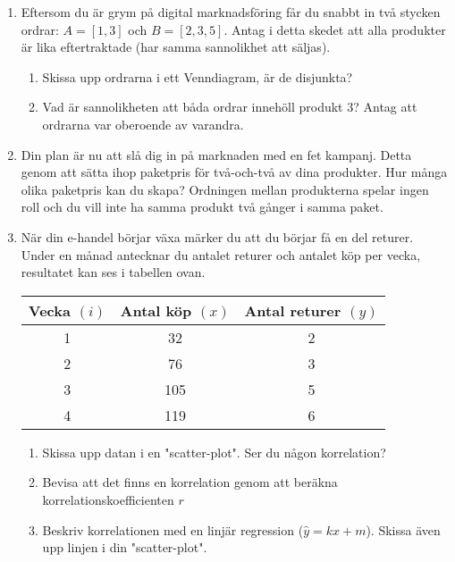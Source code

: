\documentclass[a4paper,10pt]{article}
\begin{document}
\begin{enumerate}
    \item{Eftersom du är grym på digital marknadsföring får du snabbt in två stycken ordrar: $A=[1, 3]$ och $B=[2, 3, 5]$. Antag i detta skedet att alla produkter är lika eftertraktade (har samma sannolikhet att säljas).}
    \begin{enumerate}
        \item{Skissa upp ordrarna i ett Venndiagram, är de disjunkta?}
        \vspace{8cm}
        \item{Vad är sannolikheten att båda ordrar innehöll produkt $3$? Antag att ordrarna var oberoende av varandra.}
    \end{enumerate}
    \newpage
    \item{Din plan är nu att slå dig in på marknaden med en fet kampanj. Detta genom att sätta ihop paketpris för två-och-två av dina produkter. Hur många olika paketpris kan du skapa? Ordningen mellan produkterna spelar ingen roll och du vill inte ha samma produkt två gånger i samma paket.}
    \newpage
    \item{När din e-handel börjar växa märker du att du börjar få en del returer. Under en månad antecknar du antalet returer och antalet köp per vecka, resultatet kan ses i tabellen ovan.
    \begin{table}
        \centering
        \begin{tabular}[H]{c|c|c}
        \textbf{Vecka $(i)$} & \textbf{Antal köp $(x)$}  & \textbf{Antal returer $(y)$}\\ \hline
        1                    & 32                        & 2                           \\
        2                    & 76                        & 3                           \\
        3                    & 105                       & 5                           \\
        4                    & 119                       & 6
        \end{tabular}
    \end{table}
  }
    \begin{enumerate}
        \item{Skissa upp datan i en "scatter-plot". Ser du någon korrelation?}
        \newpage
        \item{Bevisa att det finns en korrelation genom att beräkna korrelationskoefficienten $r$}
        \newpage
        \item{Beskriv korrelationen med en linjär regression ($\hat{y}=kx+m$). Skissa även upp linjen i din "scatter-plot".}

\end{enumerate}
\end{enumerate}
\end{document}
